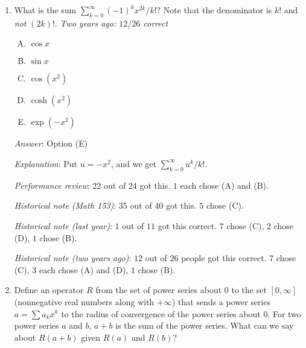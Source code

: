 \documentclass[10pt]{amsart}
\begin{document}
\begin{enumerate}
  {\em Answer}: Option (D)

  {\em Explanation}: Take the Taylor series and add. Also, use that
  both $\cosh$ and $\cos$ are globally analytic.

  {\em Performance review}: $22$ out of $24$ got this. $1$ each chose
  (B) and (C).

  {\em Historical note (Math 153)}: $35$ out of $40$ got this. $3$ chose (A),
  $1$ each chose (B) and (C).

  {\em Historical note (last year)}: $5$ out of $11$ got this correct. $3$
  chose (C), $2$ chose (A), $1$ chose (B).

  {\em Historical note (two years ago)}: $9$ out of $26$ people got this
  correct. $5$ chose (B), $4$ each chose (A), (C), and (E).

\item What is the sum $\sum_{k=0}^\infty (-1)^kx^{2k}/k!$? Note that
  the denominator is $k!$ and {\em not} $(2k)!$. {\em Two years ago:
  $12/26$ correct}

  \begin{enumerate}[(A)]
  \item $\cos x$
  \item $\sin x$
  \item $\cos(x^2)$
  \item $\cosh(x^2)$
  \item $\exp(-x^2)$
  \end{enumerate}

  {\em Answer}: Option (E)

  {\em Explanation}: Put $u = -x^2$, and we get $\sum_{k=0}^\infty
  u^k/k!$.

  {\em Performance review}: $22$ out of $24$ got this. $1$ each chose
  (A) and (B).

  {\em Historical note (Math 153)}: $35$ out of $40$ got this. $5$ chose (C).

  {\em Historical note (last year)}: $1$ out of $11$ got this correct. $7$
  chose (C), $2$ chose (D), $1$ chose (B).

  {\em Historical note (two years ago)}: $12$ out of $26$ people got this
  correct. $7$ chose (C), $3$ each chose (A) and (D), $1$ chose (B).

\item Define an operator $R$ from the set of power series about $0$
  to the set $[0,\infty]$ (nonnegative real numbers along with
  $+\infty$) that sends a power series $a = \sum a_kx^k$ to the radius
  of convergence of the power series about $0$. For two power series
  $a$ and $b$, $a + b$ is the sum of the power series. What can we say
  about $R(a + b)$ given $R(a)$ and $R(b)$?


\end{enumerate}
\end{document}
